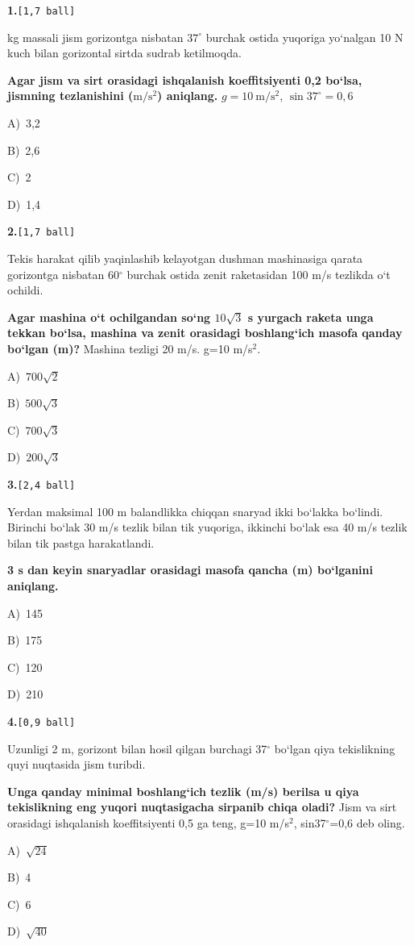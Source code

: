 \documentclass[11pt,a4paper]{article}
\newcommand{\ball}[1]{\hfill\texttt{[#1 ball]}}
\newcommand{\qhead}[2]{\Needspace{10\baselineskip}\noindent\textbf{#1.}\ball{#2}\par\nopagebreak}
\newcommand{\opt}[2]{\hspace*{8mm}#1)\ #2\par}
\newenvironment{qbody}{\begin{list}{}{\leftmargin=8mm\rightmargin=0pt\topsep=0pt\itemsep=0pt\parsep=3pt}\item\relax}{\end{list}}
\begin{document}
\noindent\begin{minipage}{\linewidth}
\qhead{1}{1,7}
\begin{qbody}
2 kg massali jism gorizontga nisbatan $37^\circ$ burchak ostida yuqoriga yo‘nalgan 10 N kuch bilan gorizontal sirtda sudrab ketilmoqda.\par
\textbf{Agar jism va sirt orasidagi ishqalanish koeffitsiyenti 0,2 bo‘lsa, jismning tezlanishini ($\mathrm{m/s^2}$) aniqlang.} $g=10\ \mathrm{m/s^2}$, $\sin37^\circ=0{,}6$\par
\smallskip
\opt{A}{3,2}
\opt{B}{2,6}
\opt{C}{2}
\opt{D}{1,4}
\end{qbody}\end{minipage}\par\vspace{16pt}
\noindent\begin{minipage}{\linewidth}
\qhead{2}{1,7}
\begin{qbody}
Tekis harakat qilib yaqinlashib kelayotgan dushman mashinasiga qarata gorizontga nisbatan 60$^\circ$ burchak ostida zenit raketasidan 100 m/s tezlikda o‘t ochildi.\par
\textbf{Agar mashina o‘t ochilgandan so‘ng $10\sqrt3$ s yurgach raketa unga tekkan bo‘lsa, mashina va zenit orasidagi boshlang‘ich masofa qanday bo‘lgan (m)?} Mashina tezligi 20 m/s. g=10 m/s$^{2}$.\par
\smallskip
\opt{A}{$700\sqrt2$}
\opt{B}{$500\sqrt3$}
\opt{C}{$700\sqrt3$}
\opt{D}{$200\sqrt3$}
\end{qbody}\end{minipage}\par\vspace{16pt}
\noindent\begin{minipage}{\linewidth}
\qhead{3}{2,4}
\begin{qbody}
Yerdan maksimal 100 m balandlikka chiqqan snaryad ikki bo‘lakka bo‘lindi. Birinchi bo‘lak 30 m/s tezlik bilan tik yuqoriga, ikkinchi bo‘lak esa 40 m/s tezlik bilan tik pastga harakatlandi.\par
\textbf{3 s dan keyin snaryadlar orasidagi masofa qancha (m) bo‘lganini aniqlang.}\par
\smallskip
\opt{A}{145}
\opt{B}{175}
\opt{C}{120}
\opt{D}{210}
\end{qbody}\end{minipage}\par\vspace{16pt}
\noindent\begin{minipage}{\linewidth}
\qhead{4}{0,9}
\begin{qbody}
Uzunligi 2 m, gorizont bilan hosil qilgan burchagi 37$^\circ$ bo‘lgan qiya tekislikning quyi nuqtasida jism turibdi.\par
\textbf{Unga qanday minimal boshlang‘ich tezlik (m/s) berilsa u qiya tekislikning eng yuqori nuqtasigacha sirpanib chiqa oladi?} Jism va sirt orasidagi ishqalanish koeffitsiyenti 0,5 ga teng, g=10 m/s$^{2}$, sin37$^\circ$=0,6 deb oling.\par
\smallskip
\opt{A}{$\sqrt{24}$}
\opt{B}{4}
\opt{C}{6}
\opt{D}{$\sqrt{40}$}
\end{qbody}\end{minipage}\par\vspace{16pt}
\end{document}
